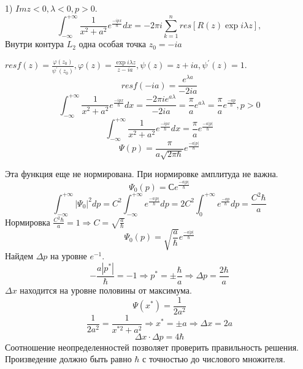 1) $Im z<0, \lambda <0, p>0$.
$$\int_{-\infty}^{+\infty} \frac{1}{x^2+a^2} e^{\frac{-ipx}{\hbar}}dx=-2\pi i \sum_{k=1}^n res [R(z)\exp{i \lambda z}],$$
Внутри контура $L_2$ одна особая точка $z_0=-ia$


$res f(z) = \frac{\varphi(z_0)}{\psi^{'}(z_0)}, \varphi(z)=\frac{\exp{i \lambda z}}{z-ia}, \psi(z)=z+ia, \psi^{'}(z)=1$.
$$res f(-ia) = \frac{e^{\lambda a}}{-2ia}$$
$$\int_{-\infty}^{+\infty} \frac{1}{x^2+a^2} e^{\frac{-ipx}{\hbar}}dx=\frac{-2\pi i e^{a\lambda}}{-2ia}=\frac{\pi}{a} e^{a\lambda}=\frac{\pi}{a} e^{\frac{-ap}{\hbar}}, p>0$$
$$\int_{-\infty}^{+\infty} \frac{1}{x^2+a^2} e^{\frac{-ipx}{\hbar}}dx=\frac{\pi}{a} e^{\frac{-a|p|}{\hbar}}$$
$$\Psi(p)=\frac{\pi}{a\sqrt{2\pi \hbar}}e^{\frac{-a|p|}{\hbar}}$$

Эта функция еще не нормирована. При нормировке амплитуда не важна.
 $$\Psi_0(p)=С e^{\frac{-a|p|}{\hbar}}$$
 $$\int_{-\infty}^{+\infty} |\Psi_0|^2 dp=C^2 \int_{-\infty}^{+\infty}e^{\frac{-a|p|}{\hbar}} dp= 2C^2 \int_{0}^{+\infty}e^{\frac{-ap}{\hbar}}dp=\frac{C^2\hbar}{a}$$
 Нормировка $\frac{C^2\hbar}{a}=1 \Longrightarrow C=\sqrt{\frac{a}{\hbar}}$ 
 $$\Psi_0(p)=\sqrt{\frac{a}{\hbar}} e^{\frac{-a|p|}{\hbar}}$$
 Найдем $\Delta p$ на уровне $e^{-1}$.
 $$-\frac{a|p^*|}{\hbar}=-1 \Longrightarrow p^*=\pm \frac{\hbar}{a} \Longrightarrow \Delta p=\frac{2\hbar}{a}$$
$\Delta x$ находится на уровне половины от максимума.
$$\Psi(x^*)=\frac{1}{2a^2}$$
$$\frac{1}{2a^2}=\frac{1}{x^{*2}+a^2} \Longrightarrow x^*=\pm a \Longrightarrow \Delta x=2a$$
$$\Delta x \cdot \Delta p= 4\hbar$$
 Соотношение неопределенностей позволяет проверить правильность решения. Произведение должно быть равно $\hbar$ с точностью до числового множителя.


